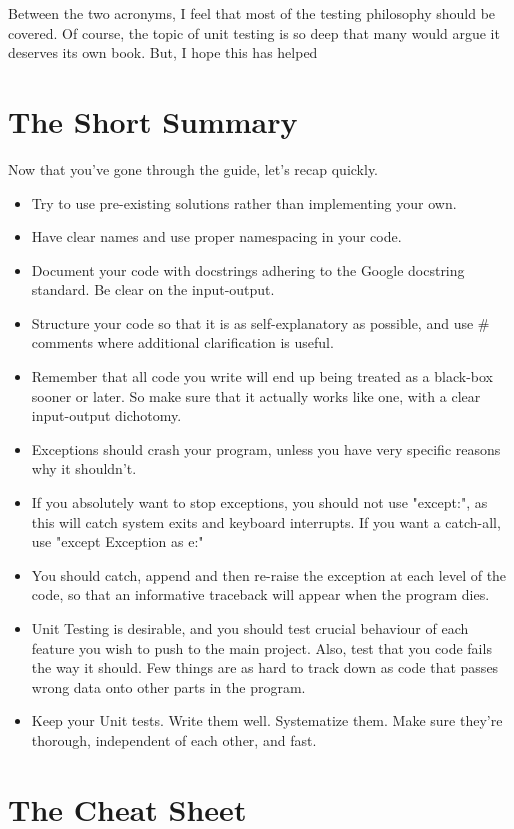 \documentclass[10pt,a4paper]{article}
\begin{document}
Between the two acronyms, I feel that most of the testing philosophy should be covered. Of course, the topic of unit testing is so deep that many would argue it deserves its own book. But, I hope this has helped

\newpage
\section{The Short Summary}
Now that you've gone through the guide, let's recap quickly.

\begin{itemize}
\item Try to use pre-existing solutions rather than implementing your own.
\item Have clear names and use proper namespacing in your code. 
\item Document your code with docstrings adhering to the Google docstring standard. Be clear on the input-output.
\item Structure your code so that it is as self-explanatory as possible, and use \# comments where additional clarification is useful.
\item Remember that all code you write will end up being treated as a black-box sooner or later. So make sure that it actually works like one, with a clear input-output dichotomy. 
\item Exceptions should crash your program, unless you have very specific reasons why it shouldn't.
\item If you absolutely want to stop exceptions, you should not use "except:", as this will catch system exits and keyboard interrupts. If you want a catch-all, use "except Exception as e:"
\item You should catch, append and then re-raise the exception at each level of the code, so that an informative traceback will appear when the program dies.
\item Unit Testing is desirable, and you should test crucial behaviour of each feature you wish to push to the main project. Also, test that you code fails the way it should. Few things are as hard to track down as code that passes wrong data onto other parts in the program.
\item Keep your Unit tests. Write them well. Systematize them. Make sure they're thorough, independent of each other, and fast.
\end{itemize}

\newpage
\section{The Cheat Sheet}
\end{document}
